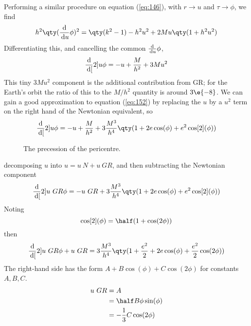 Performing a similar procedure on equation (\ref{eq:146}), with $r \to
u$ and $\tau \to \phi$, we find
\begin{equation}
  \label{eq:151}
  h^2 \qty( \dv{u}{\phi})^2 = \qty(k^2 - 1) - h^2u^2 + 2 Mu \qty( 1+h^2u^2) 
\end{equation}
Differentiating this, and cancelling the common $\frac{\mathrm{d}}{\,\mathrm{d} u}{\phi}$,
\begin{equation}
  \label{eq:152}
  \frac{\mathrm{d}}{\,\mathrm{d} [}2]{u}{\phi}  = -u + \frac{M}{h^2} + 3 Mu^2
\end{equation}
This tiny $3Mu^2$ component is the additional contribution from GR;
for the Earth's orbit the ratio of this to the $M/h^2$ quantity is
around $3\e{-8}$. We can gain a good approximation to equation
(\ref{eq:152}) by replacing the $u$ by a $u^2$ term on the right hand
of the Newtonian equivalent, so
\begin{equation}
  \label{eq:153}
  \dv[2]{u}{\phi} = -u + \frac{M}{h^2} + 3 \frac{M^3}{h^4} \qty( 1 + 2e \cos(\phi) + e^2 \cos[2](\phi) )
\end{equation}
\begin{figure}[t] \centering
{}
\caption{The precession of the pericentre.}
\end{figure}
decomposing $u$ into $u = u~N + u~{GR}$, and then subtracting the Newtonian component
\begin{equation}
  \label{eq:155}
  \dv[2]{u~{GR}}{\phi} = -u~{GR} + 3 \frac{M^3}{h^4} \qty(1+ 2e \cos(\phi) + e^2 \cos[2](\phi) )
\end{equation}
Noting
\begin{equation}
  \label{eq:154}
  \cos[2](\phi) = \half (1 + \cos(2 \phi) )
\end{equation}
then
\begin{equation}
  \label{eq:156}
  \dv[2]{u~{GR}}{\phi} + u~{GR} = 3 \frac{M^3}{h^4} \qty( 1 + \frac{e^2}{2} + 2e \cos(\phi) + \frac{e^2}{2} \cos(2 \phi) )
\end{equation}
The right-hand side has the form $A + B \cos(\phi) + C \cos(2 \phi)$ for constants $A,B,C$.
\begin{subequations}
  \begin{align}
    u~{GR} &= A \\ &= \half B \phi \sin(\phi) \\ &= - \frac{1}{3} C \cos(2 \phi)
  \end{align}
\end{subequations}
